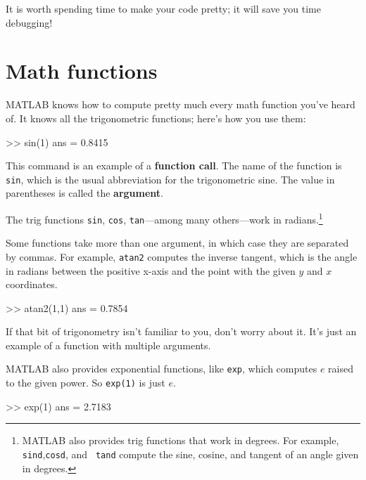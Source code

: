 \documentclass[main.tex]{subfiles}
\begin{document}
\begin{quote}
\end{quote}

It is worth spending time to make your code pretty; it will save
you time debugging!


\section{Math functions}

MATLAB knows how to compute pretty much every math function you've
heard of.  It knows all the trigonometric functions; here's how you
use them:


\begin{code}
>> sin(1)
ans = 0.8415
\end{code}

This command is an example of a {\bf function call}.  The name of the
function is {\tt sin}, which is the usual abbreviation for the
trigonometric sine.  The value in parentheses is called the {\bf argument}.


The trig functions {\tt sin}, {\tt cos}, {\tt tan}---among many
others---work in radians.\footnote{MATLAB also provides trig functions
that work in degrees. For example, {\tt sind},{\tt cosd}, and {\tt
tand} compute the sine, cosine, and tangent of an angle given in
degrees.}

Some functions take more than one argument, in which case they are
separated by commas.  For example, {\tt atan2} computes the inverse
tangent, which is the angle in radians between the positive x-axis and
the point with the given $y$ and $x$ coordinates.

\begin{code}
>> atan2(1,1)
ans = 0.7854
\end{code}

If that bit of trigonometry isn't familiar to you, don't worry about
it.  It's just an example of a function with multiple arguments.


MATLAB also provides exponential functions, like {\tt exp}, which computes $e$ raised to the given power.  So {\tt exp(1)} is just $e$.

\begin{code}
>> exp(1)
ans = 2.7183
\end{code}
\end{document}
